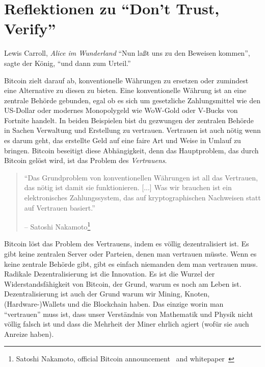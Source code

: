 \chapter{Reflektionen zu \enquote{Don't Trust, Verify}}
\label{les:16}

\begin{chapquote}{Lewis Carroll, \textit{Alice im Wunderland}}
\enquote{Nun laßt uns zu den Beweisen kommen}, sagte der König, \enquote{und dann zum Urteil.}
\end{chapquote}

Bitcoin zielt darauf ab, konventionelle Währungen zu ersetzen oder zumindest eine
Alternative zu diesen zu bieten. Eine konventionelle Währung ist an eine
zentrale Behörde gebunden, egal ob es sich um gesetzliche Zahlungsmittel wie den
US-Dollar oder modernes Monopolygeld wie WoW-Gold oder V-Bucks von Fortnite
handelt. In beiden Beispielen bist du gezwungen der zentralen Behörde in Sachen
Verwaltung und Erstellung zu vertrauen. Vertrauen ist auch nötig wenn es darum
geht, das erstellte Geld auf eine faire Art und Weise in Umlauf zu bringen.
Bitcoin beseitigt diese Abhängigkeit, denn das Hauptproblem, das durch Bitcoin
gelöst wird, ist das Problem des \textit{Vertrauens}.

\begin{quotation}\begin{samepage}
\enquote{Das Grundproblem von konventionellen Währungen ist all das Vertrauen,
das nötig ist damit sie funktionieren. [...] Was wir brauchen ist ein
elektronisches Zahlungssystem, das auf kryptographischen Nachweisen statt auf
Vertrauen basiert.}
\begin{flushright} -- Satoshi Nakamoto\footnote{Satoshi Nakamoto, official Bitcoin announcement~\cite{bitcoin-announcement} and whitepaper~\cite{whitepaper}}
\end{flushright}\end{samepage}\end{quotation}

Bitcoin löst das Problem des Vertrauens, indem es völlig dezentralisiert ist. Es
gibt keine zentralen Server oder Parteien, denen man vertrauen müsste. Wenn es
keine zentrale Behörde gibt, gibt es einfach niemanden dem man vertrauen muss.
Radikale Dezentralisierung ist die Innovation. Es ist die Wurzel der
Widerstandsfähigkeit von Bitcoin, der Grund, warum es noch am Leben ist.
Dezentralisierung ist auch der Grund warum wir Mining, Knoten, (Hardware-)Wallets
und die Blockchain haben. Das einzige worin man \enquote{vertrauen} muss ist,
dass unser Verständnis von Mathematik und Physik nicht völlig falsch ist
und dass die Mehrheit der Miner ehrlich agiert (wofür sie auch Anreize haben).

